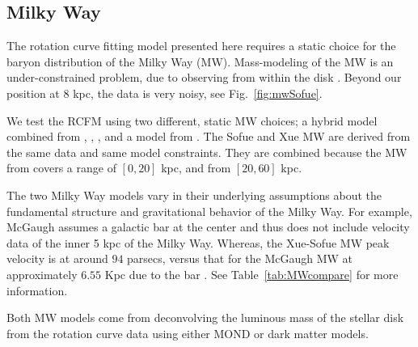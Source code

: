 \documentclass[reprint,%
 amsmath,amssymb,
 aps,
]{revtex4-1}
\begin{document}
 
   

  
 


\subsection{Milky Way}\label{MWselect}


The rotation curve fitting model presented here requires a static choice for the baryon distribution of the   Milky Way (MW). 
Mass-modeling of the MW is an under-constrained problem, due to     observing from       within  the disk  \cite{1991ARA&A..29..409F}.
 Beyond our position at 8 kpc, the data is very 
 noisy, see  Fig.~\ref{fig:mwSofue}.  
 
 
 We test the RCFM   using two different, static MW choices; 
   a hybrid model combined from  \citet{Xue}, 
  \citet{Sofue}, \cite{sofue2009unified}, and 
  a model from  \citet{McGaugh_2019}. The Sofue and Xue MW are derived from the same data and same model constraints.     They are combined because the MW from  \citet{Sofue} covers a range of   $[0,20]$ kpc, and   \citet{Xue} from
  $[20,60]$ kpc. 
  
   The  two Milky Way models vary in their underlying assumptions about the fundamental structure and gravitational behavior of the Milky Way. For example, McGaugh \cite{McGaugh_2019} assumes a galactic bar at the center and thus does not include velocity data of the inner 5 kpc of the Milky Way.  Whereas, the Xue-Sofue MW peak velocity is   at around $94$ parsecs, versus that for  the McGaugh MW   at  approximately  $6.55$ Kpc due to the   bar  \cite{McGaugh_2019}. See Table~\ref{tab:MWcompare} for more information.
  
  
  
Both MW models come from    deconvolving the   luminous mass of the stellar disk  from the rotation curve data  using either MOND or dark matter models. 
   
   
   

 
    
  
  
\end{document}

